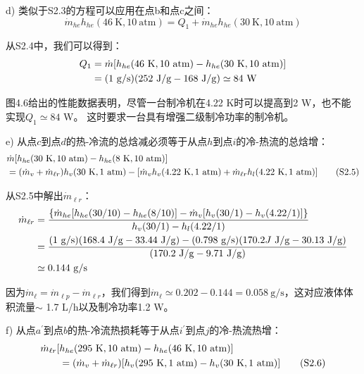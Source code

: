 d) 类似于S2.3的方程可以应用在点b和点c之间：
\begin{equation*}%
\dot{m}_{he}h_{he}(46\ \mathrm{K},10\ \mathrm{atm})=Q_1+\dot{m}_{he}h_{he}(30\ \mathrm{K},10\ \mathrm{atm})
\end{equation*}

从S2.4中，我们可以得到：
\begin{align*}%
Q_1&=\dot{m}[h_{he}(46\ \mathrm{K},10\ \mathrm{atm})-h_{he}(30\ \mathrm{K},10\ \mathrm{atm})]\\\notag
&=(1\ \mathrm{g/s})(252\ \mathrm{J/g}-168\ \mathrm{J/g})\simeq 84\ \mathrm{W}
\end{align*}

图4.6给出的性能数据表明，尽管一台制冷机在4.22 K时可以提高到2 W，也不能实现$Q_1\simeq 84$ W。
这时要求一台具有增强二级制冷功率的制冷机。

e) 从点$c$到点$d$的热-冷流的总焓减必须等于从点$h$到点$i$的冷-热流的总焓增：
\begin{align*}%
&\dot{m}[h_{he}(30\ \mathrm{K},10\ \mathrm{atm})-h_{he}(8\ \mathrm{K},10\ \mathrm{atm})]\\\notag
&=(\dot{m}_v+\dot{m}_{\ell r})h_v(30\ \mathrm{K},1\ \mathrm{atm})-[\dot{m}_vh_v(4.22\ \mathrm{K},1\ \mathrm{atm})+\dot{m}_{\ell r}h_l(4.22\ \mathrm{K},1\ \mathrm{atm})] \tag{S2.5}
\end{align*}

从S2.5中解出$\dot{m}_{\ell r}$：
\begin{align*}%
\dot{m}_{\ell r}&=\frac{\{\dot{m}_{he}[h_{he}(30/10)-h_{he}(8/10)]-\dot{m}_v[h_v(30/1)-h_{v}(4.22/1)]\}}{h_v(30/1)-h_{l}(4.22/1)}\\\notag
&=\frac{(1\ \mathrm{g/s})(168.4\ \mathrm{J/g}-33.44\ \mathrm{J/g})-(0.798 \ \mathrm{g/s})(170.2J\ \mathrm{J/g}-30.13\ \mathrm{J/g})}{(170.2\ \mathrm{J/g}-9.71\ \mathrm{J/g})}\\\notag
&\simeq 0.144 \ \mathrm{g/s}
\end{align*}

因为$\dot{m}_{\ell}=\dot{m}_{\ell p}-\dot{m}_{\ell r}$，我们得到$\dot{m}_{\ell}\simeq 0.202-0.144=0.058\ \mathrm{g/s}$，这对应液体体积流量$\sim$ 1.7 L/h以及制冷功率1.2 W。

f) 从点$a^\prime$到点$b$的热-冷流热损耗等于从点$i^\prime$到点$j$的冷-热流热增：
\begin{align*}%
\dot{m}_{\ell r}[&h_{he}(295\ \mathrm{K},10\ \mathrm{atm})-h_{he}(46\ \mathrm{K},10\ \mathrm{atm})]\\\notag
&=(\dot{m}_v+\dot{m}_{\ell r})[h_v(295\ \mathrm{K},1\ \mathrm{atm})-h_{v}(30\ \mathrm{K},1\ \mathrm{atm})] \tag{S2.6}
\end{align*}

